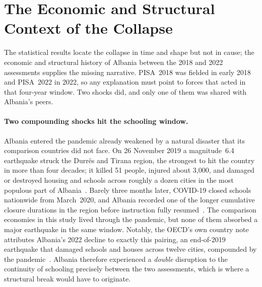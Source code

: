 \section{The Economic and Structural Context of the Collapse}
\label{sec:context}

The statistical results locate the collapse in time and shape but not in cause; the
economic and structural history of Albania between the 2018 and 2022 assessments
supplies the missing narrative. PISA~2018 was fielded in early 2018 and PISA~2022 in
2022, so any explanation must point to forces that acted in that four-year window. Two
shocks did, and only one of them was shared with Albania's peers.

\paragraph{Two compounding shocks hit the schooling window.}
Albania entered the pandemic already weakened by a natural disaster that its comparison
countries did not face. On 26 November 2019 a magnitude~6.4 earthquake struck the
Durr\"es and Tirana region, the strongest to hit the country in more than four decades;
it killed 51 people, injured about 3{,}000, and damaged or destroyed housing and
schools across roughly a dozen cities in the most populous part of
Albania~\citep{albania_pdna2020}. Barely three months later, COVID-19 closed schools
nationwide from March~2020, and Albania recorded one of the longer cumulative closure
durations in the region before instruction fully
resumed~\citep{unesco2022closures,worldbank_covid_learning}. The comparison economies in
this study lived through the pandemic, but none of them absorbed a major earthquake in
the same window. Notably, the OECD's own country note attributes Albania's 2022 decline
to exactly this pairing, an end-of-2019 earthquake that damaged schools and houses
across twelve cities, compounded by the pandemic~\citep{oecd_albania_note2023}. Albania
therefore experienced a \emph{double} disruption to the continuity of schooling
precisely between the two assessments, which is where a structural break would have to
originate.

